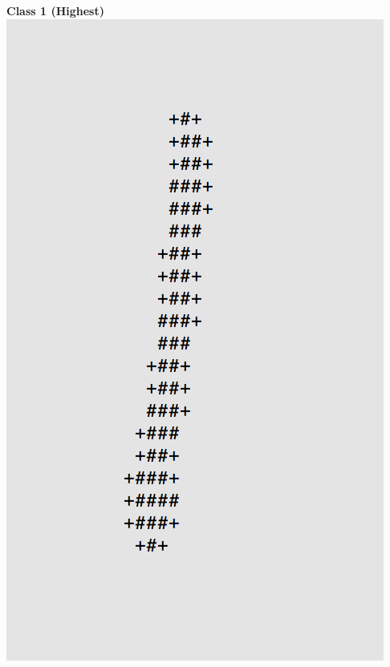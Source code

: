 \documentclass[11pt]{article}
\begin{document}
\begin{center}
\begin{multicols}{2}
\textbf{Class 1 (Highest)}\\
\includegraphics[scale=0.4]{part1/1/high_1.png}


\end{multicols}
\end{center}
\end{document}
